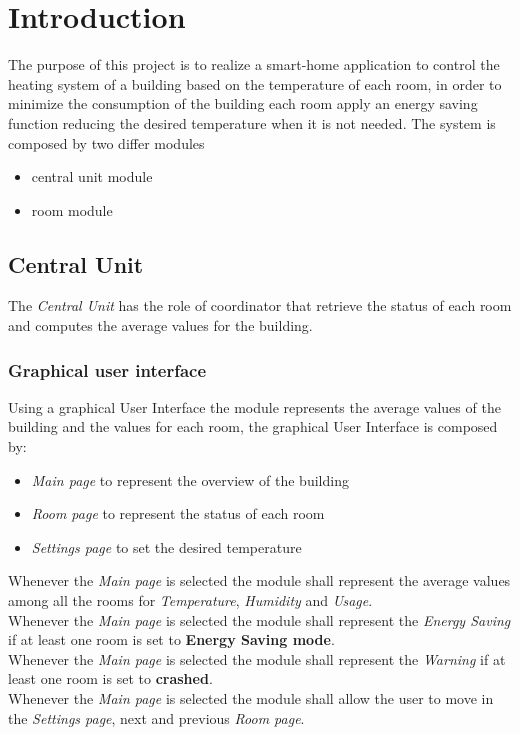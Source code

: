 \section{Introduction}
The purpose of this project is to realize a smart-home application to control the heating system of a building based on the temperature of each room, in order to minimize the consumption of the building each room apply an energy saving function reducing the desired temperature when it is not needed.
The system is composed by two differ modules
\begin{itemize}
	\item central unit module 
	\item room module
\end{itemize}

\subsection{Central Unit}
The \textit{Central Unit} has the role of coordinator that retrieve the status of each room and computes the average values for the building.\\

\subsubsection{Graphical user interface}
Using a graphical User Interface the module represents the average values of the building and the values for each room, the graphical User Interface is composed by:
\begin{itemize}
	\item \textit{Main page} to represent the overview of the building
	\item \textit{Room page} to represent the status of each room
	\item \textit{Settings page} to set the desired temperature
\end{itemize}

Whenever the \textit{Main page} is selected the module shall represent the average values among all the rooms for \textit{Temperature}, \textit{Humidity} and \textit{Usage}.\\
Whenever the \textit{Main page} is selected the module shall represent the \textit{Energy Saving} if at least one room is set to \textbf{Energy Saving mode}.\\
Whenever the \textit{Main page} is selected the module shall represent the \textit{Warning} if at least one room is set to \textbf{crashed}.\\
Whenever the \textit{Main page} is selected the module shall allow the user to move in the \textit{Settings page}, next and previous \textit{Room page}.\\

